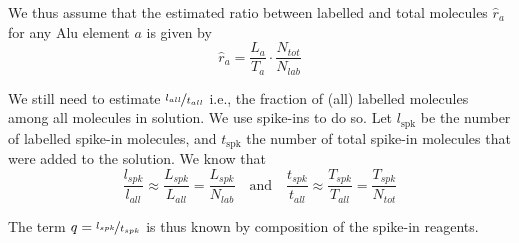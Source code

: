 \noindent We thus assume that the estimated ratio between labelled and total
molecules $\hat{r}_{a}$ for any Alu element $a$ is given by
\begin{equation*}
\hat{r}_{a}=\frac{L_{a}}{T_{a}}\cdot\frac{N_{tot}}{N_{lab}}
\end{equation*}

\noindent We still need to estimate $\nicefrac{l_{all}}{t_{all}}$ i.e., the
fraction of (all) labelled molecules among all molecules in solution. We use
spike-ins to do so. Let $l_{\text{spk}}$ be the number of labelled spike-in
molecules, and $t_{\text{spk}}$ the number of total spike-in molecules that were
added to the solution. We know that
\begin{equation}
\frac{l_{spk}}{l_{all}}\approx\frac{L_{spk}}{L_{all}}=\frac{L_{spk}}{N_{lab}}
\quad\text{and}\quad
\frac{t_{spk}}{t_{all}}\approx\frac{T_{spk}}{T_{all}}=\frac{T_{spk}}{N_{tot}}
\label{spk}
\end{equation}

\noindent The term $q=\nicefrac{l_{spk}}{t_{spk}}$ is thus known by composition
of the spike-in reagents.

\listoffigures

\listoftables


\cleardoublepage



\cleardoublepage




